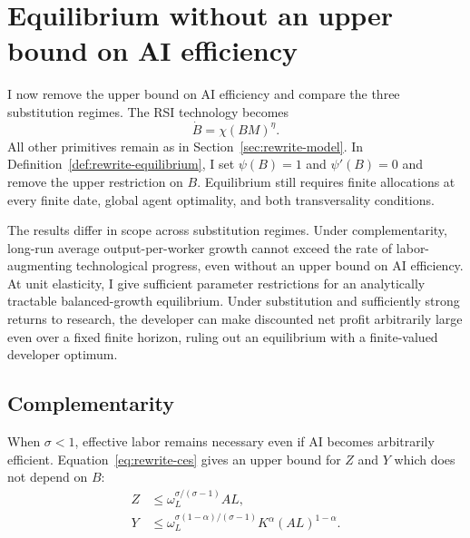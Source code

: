 \section{Equilibrium without an upper bound on AI efficiency}
\label{sec:rewrite-uncapped}

I now remove the upper bound on AI efficiency and compare the three
substitution regimes. The RSI technology becomes
\begin{equation}
 \dot B=\chi(BM)^\eta.
 \label{eq:rewrite-uncapped-unit-law}
\end{equation}
All other primitives remain as in Section~\ref{sec:rewrite-model}.
In Definition~\ref{def:rewrite-equilibrium}, I set $\psi(B)=1$ and
$\psi'(B)=0$ and remove the upper restriction on $B$. Equilibrium still
requires finite allocations at every finite date, global agent optimality,
and both transversality conditions. %

The results differ in scope across substitution regimes. Under complementarity, long-run average output-per-worker growth cannot exceed the rate of labor-augmenting technological progress, even without an upper bound on AI efficiency. At unit elasticity, I give sufficient parameter restrictions for an analytically tractable balanced-growth equilibrium. Under substitution and sufficiently strong returns to research, the developer can make discounted net profit arbitrarily large even over a fixed finite horizon, ruling out an equilibrium with a finite-valued developer optimum.

\subsection{Complementarity}
\label{subsec:rewrite-uncapped-complements}

When $\sigma<1$, effective labor remains necessary even if AI becomes arbitrarily efficient. Equation~\eqref{eq:rewrite-ces} gives an upper bound for $Z$ and $Y$ which does not depend on $B$:
\begin{align}
 Z&\leq\omega_L^{\sigma/(\sigma-1)}AL,
 \label{eq:rewrite-uncapped-complements-z-bound}\\
 Y&\leq\omega_L^{\sigma(1-\alpha)/(\sigma-1)}
 K^\alpha(AL)^{1-\alpha}.
 \label{eq:rewrite-uncapped-complements-y-bound}
\end{align}

